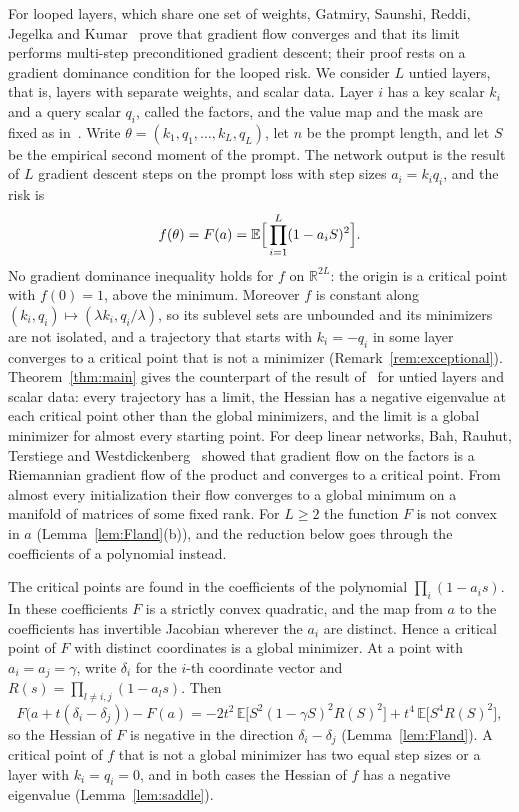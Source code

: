 \documentclass[11pt]{amsart}
\theoremstyle{remark}
\numberwithin{equation}{section}
\newcommand{\EE}{\mathbb{E}}
\newcommand{\RR}{\mathbb{R}}
\begin{document}
For looped layers, which share one set of weights, Gatmiry, Saunshi, Reddi, Jegelka and Kumar~\cite{Gatmiry} prove that gradient flow converges and that its limit performs multi-step preconditioned gradient descent; their proof rests on a gradient dominance condition for the looped risk. We consider $L$ untied layers, that is, layers with separate weights, and scalar data. Layer $i$ has a key scalar $k_i$ and a query scalar $q_i$, called the factors, and the value map and the mask are fixed as in~\cite{Gatmiry}. Write $\theta=(k_1,q_1,\dots,k_L,q_L)$, let $n$ be the prompt length, and let $S$ be the empirical second moment of the prompt. The network output is the result of $L$ gradient descent steps on the prompt loss with step sizes $a_i=k_iq_i$, and the risk is
\[
f(\theta)=F(a)=\EE\Bigl[\,\prod_{i=1}^{L}(1-a_iS)^2\Bigr].
\]
No gradient dominance inequality holds for $f$ on $\RR^{2L}$: the origin is a critical point with $f(0)=1$, above the minimum. Moreover $f$ is constant along $(k_i,q_i)\mapsto(\lambda k_i,q_i/\lambda)$, so its sublevel sets are unbounded and its minimizers are not isolated, and a trajectory that starts with $k_i=-q_i$ in some layer converges to a critical point that is not a minimizer (Remark~\ref{rem:exceptional}). Theorem~\ref{thm:main} gives the counterpart of the result of~\cite{Gatmiry} for untied layers and scalar data: every trajectory has a limit, the Hessian has a negative eigenvalue at each critical point other than the global minimizers, and the limit is a global minimizer for almost every starting point. For deep linear networks, Bah, Rauhut, Terstiege and Westdickenberg~\cite{BRTW} showed that gradient flow on the factors is a Riemannian gradient flow of the product and converges to a critical point. From almost every initialization their flow converges to a global minimum on a manifold of matrices of some fixed rank. For $L\ge2$ the function $F$ is not convex in $a$ (Lemma~\ref{lem:Fland}(b)), and the reduction below goes through the coefficients of a polynomial instead.

The critical points are found in the coefficients of the polynomial $\prod_i(1-a_is)$. In these coefficients $F$ is a strictly convex quadratic, and the map from $a$ to the coefficients has invertible Jacobian wherever the $a_i$ are distinct. Hence a critical point of $F$ with distinct coordinates is a global minimizer. At a point with $a_i=a_j=\gamma$, write $\delta_i$ for the $i$-th coordinate vector and $R(s)=\prod_{l\ne i,j}(1-a_ls)$. Then
\[
F\bigl(a+t(\delta_i-\delta_j)\bigr)-F(a)=-2t^2\,\EE\bigl[S^2(1-\gamma S)^2R(S)^2\bigr]+t^4\,\EE\bigl[S^4R(S)^2\bigr],
\]
so the Hessian of $F$ is negative in the direction $\delta_i-\delta_j$ (Lemma~\ref{lem:Fland}). A critical point of $f$ that is not a global minimizer has two equal step sizes or a layer with $k_i=q_i=0$, and in both cases the Hessian of $f$ has a negative eigenvalue (Lemma~\ref{lem:saddle}).
\end{document}
